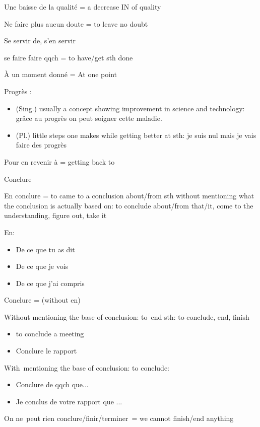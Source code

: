 Une baisse de la qualité = a decrease IN {of} quality~

Ne faire plus aucun doute = to leave no doubt~

Se servir de, s'en servir~

se faire faire qqch = to have/get sth done

À un moment donné = At one point

Progrès :

\begin{itemize}
\item
  (Sing.) usually a concept showing improvement in science and
  technology: grâce au progrès on peut soigner cette maladie.~
\item
  (Pl.) little steps one makes while getting better at sth: je suis nul
  mais je vais faire des progrès~
\end{itemize}

Pour en revenir à = getting back to~

Conclure~

En conclure = to came to a conclusion about/from sth without mentioning
what the conclusion is actually based on: to conclude about/from
that/it, come to the understanding, figure out, take it

En:

\begin{itemize}
\item
  De ce que tu as dit
\item
  De ce que je vois~
\item
  De ce que j'ai compris~
\end{itemize}

Conclure = (without en)

Without mentioning the base of conclusion: to~end sth: to conclude, end,
finish

\begin{itemize}
\item
  to conclude a meeting~
\item
  Conclure le rapport~
\end{itemize}

With~mentioning the base of conclusion: to conclude:

\begin{itemize}
\item
  Conclure de qqch que...
\item
  Je conclus de votre rapport que ...
\end{itemize}

On ne~peut rien conclure/finir/terminer~= we cannot finish/end anything~

